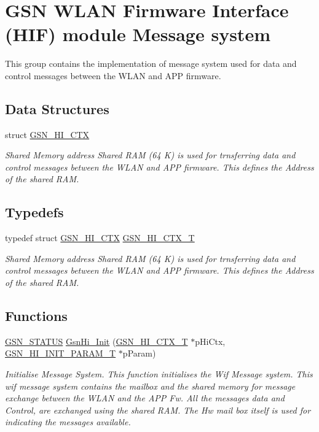 \hypertarget{a00623}{
\section{GSN WLAN Firmware Interface (HIF) module Message system}
\label{a00623}
}


This group contains the implementation of message system used for data and control messages between the WLAN and APP firmware.  


\subsection*{Data Structures}
\begin{DoxyCompactItemize}
\item 
struct \hyperlink{a00085}{GSN\_\-HI\_\-CTX}
\begin{DoxyCompactList}\small\item\em Shared Memory address Shared RAM (64 K) is used for trnsferring data and control messages between the WLAN and APP firmware. This defines the Address of the shared RAM. \end{DoxyCompactList}\end{DoxyCompactItemize}
\subsection*{Typedefs}
\begin{DoxyCompactItemize}
\item 
typedef struct \hyperlink{a00085}{GSN\_\-HI\_\-CTX} \hyperlink{a00623_gab04b88d48bd4d71618f6790808c3484c}{GSN\_\-HI\_\-CTX\_\-T}
\begin{DoxyCompactList}\small\item\em Shared Memory address Shared RAM (64 K) is used for trnsferring data and control messages between the WLAN and APP firmware. This defines the Address of the shared RAM. \end{DoxyCompactList}\end{DoxyCompactItemize}
\subsection*{Functions}
\begin{DoxyCompactItemize}
\item 
\hyperlink{a00660_gada5951904ac6110b1fa95e51a9ddc217}{GSN\_\-STATUS} \hyperlink{a00623_ga9d165724225b153f84dcf1184ebcf044}{GsnHi\_\-Init} (\hyperlink{a00085}{GSN\_\-HI\_\-CTX\_\-T} $\ast$pHiCtx, \hyperlink{a00088}{GSN\_\-HI\_\-INIT\_\-PARAM\_\-T} $\ast$pParam)
\begin{DoxyCompactList}\small\item\em Initialise Message System. This function initialises the Wif Message system. This wif message system contains the mailbox and the shared memory for message exchange between the WLAN and the APP Fw. All the messages data and Control, are exchanged using the shared RAM. The Hw mail box itself is used for indicating the messages available. \end{DoxyCompactList}\end{DoxyCompactItemize}


